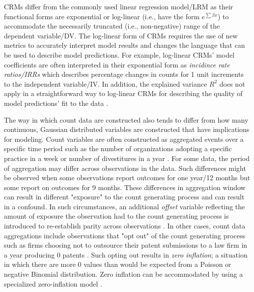 \documentclass[ShortAfour,times,sageapa]{sagej}
\begin{document}
	CRMs differ from the commonly used linear regression model/LRM as their functional forms are exponential or log-linear (i.e., have the form $e^{\sum\beta x}$) to accommodate the necessarily truncated (i.e., non-negative) range of the dependent variable/DV.	
	The log-linear form of CRMs requires the use of new metrics to accurately interpret model results and changes the language that can be used to describe model predictions.
	For example, log-linear CRMs' model coefficients are often interpreted in their exponential form as \emph{incidince rate ratios/IRRs} which describes percentage changes in counts for 1 unit increments to the independent variable/IV.
	In addition, the explained variance $R^2$ does not apply in a straightforward way to log-linear CRMs for describing the quality of model predictions' fit to the data \cite{cameron1996r}.
	
	The way in which count data are constructed also tends to differ from how many continuous, Gaussian distributed variables are constructed that have implications for modeling.
	Count variables are often constructed as aggregated events over a specific time period such as the number of organizations adopting a specific practice in a week \cite{naumovska2021strength} or number of divestitures in a year \cite{bettinazzi2021stakeholder}. 
	For some data, the period of aggregation may differ across observations in the data.
	Such differences might be observed when some observations report outcomes for one year/12 months but some report on outcomes for 9 months.
	These differences in aggregation window can result in different "exposure" to the count generating process and can result in a confound.
	In such circumstances, an additional \emph{offset} variable reflecting the amount of exposure the observation had to the count generating process is introduced to re-establish parity across observations \cite[see, for an example]{glerum2021trainer}.
	In other cases, count data aggregations include observations that "opt out" of the count generating process such as firms choosing not to outsource their patent submissions to a law firm in a year producing 0 patents \cite{somaya2008gone}.
	Such opting out results in \emph{zero inflation}; a situation in which there are more 0 values than would be expected from a Poisson or negative Binomial distribution.  
	Zero inflation can be accommodated by using a specialized zero-inflation model \cite[again see, for an example]{glerum2021trainer}. 
	
\end{document}
